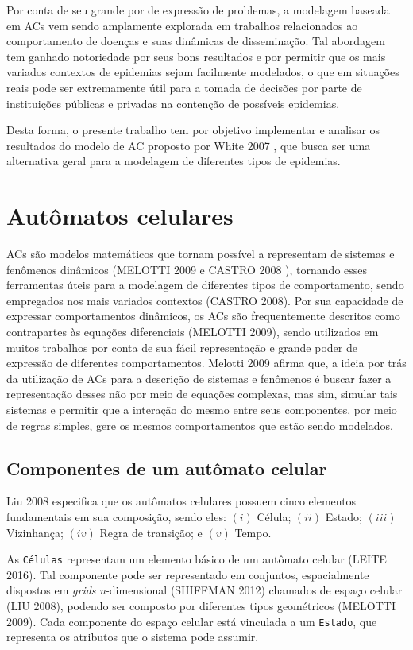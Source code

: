 \documentclass[a4paper,12pt]{article}
\begin{document}
Por conta de seu grande por de expressão de problemas, a modelagem baseada em ACs vem sendo amplamente explorada em trabalhos relacionados ao comportamento de doenças e suas dinâmicas de disseminação. Tal abordagem tem ganhado notoriedade por seus bons resultados e por permitir que os mais variados contextos de epidemias sejam facilmente modelados, o que em situações reais pode ser extremamente útil para a tomada de decisões por parte de instituições públicas e privadas na contenção de possíveis epidemias.

Desta forma, o presente trabalho tem por objetivo implementar e analisar os resultados do modelo de AC proposto por White 2007 \cite{White2007}, que busca ser uma alternativa geral para a modelagem de diferentes tipos de epidemias. 

\section{Autômatos celulares}
\par ACs são modelos matemáticos que tornam possível a representam de sistemas e fenômenos dinâmicos (MELOTTI 2009 \cite{Melotti2009} e CASTRO 2008 \cite{Castro2008}), tornando esses ferramentas úteis para a modelagem de diferentes tipos de comportamento, sendo empregados nos mais variados contextos (CASTRO 2008\cite{Castro2008}). Por sua capacidade de expressar comportamentos dinâmicos, os ACs são frequentemente descritos como contrapartes às equações diferenciais (MELOTTI 2009\cite{Melotti2009}), sendo utilizados em muitos trabalhos por conta de sua fácil representação e grande poder de expressão de diferentes comportamentos. Melotti 2009\cite{Melotti2009} afirma que, a ideia por trás da utilização de ACs para a descrição de sistemas e fenômenos é buscar fazer a representação desses não por meio de equações complexas, mas sim, simular tais sistemas e permitir que a interação do mesmo entre seus componentes, por meio de regras simples, gere os mesmos comportamentos que estão sendo modelados. 

\subsection{Componentes de um autômato celular}
Liu 2008 \cite{Liu2008} especifica que os autômatos celulares possuem cinco elementos fundamentais em sua composição, sendo eles: $(i)$ Célula; $(ii)$ Estado; $(iii)$ Vizinhança; $(iv)$ Regra de transição; e $(v)$ Tempo.

As \texttt{Células} representam um elemento básico de um autômato celular (LEITE 2016\cite{Leite2016}). Tal componente pode ser representado em conjuntos, espacialmente dispostos em \textit{grids} \textit{n}-dimensional (SHIFFMAN 2012\cite{Shiffman2012}) chamados de espaço celular (LIU 2008\cite{Liu2008}), podendo ser composto por diferentes tipos geométricos (MELOTTI 2009\cite{Melotti2009}). Cada componente do espaço celular está vinculada a um \texttt{Estado}, que representa os atributos que o sistema pode assumir.\\
\end{document}

